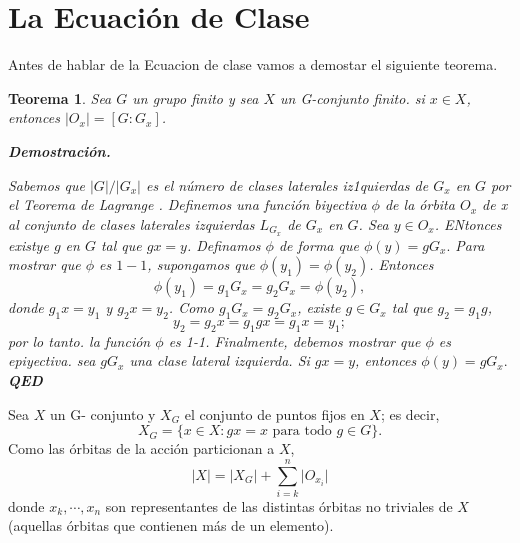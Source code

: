 \documentclass{article}
\newcounter{Teorema}
\numberwithin{equation}{section}
\theoremstyle{plain}  %
\newtheorem{thm}{Teorema}[section]
\providecommand{\abs}[1]{\lvert#1\rvert} %
\begin{document}
\tableofcontents
\newpage

	
\pagestyle{fancy}
\mbox{}	
\lhead[]{}
\newpage
\section{La Ecuación de Clase}
Antes de hablar de la Ecuacion de clase vamos a demostar el siguiente teorema. 
\begin{thm}
Sea $G$ un grupo finito y sea $X$ un G-conjunto finito. si $x  \in X$, entonces $\abs{O_{x}} = [G : G_{x}]$.

\vspace{5mm}
\textbf{Demostración.}
\vspace{5mm}

Sabemos que $\abs{G}/\abs{G_{x}} $
es el número de clases laterales iz1quierdas de $G_{x}$ en $G$ por el Teorema de Lagrange .
Definemos una función biyectiva $\phi$ de la órbita $O_{x}$ de x al conjunto de clases laterales izquierdas $L_{G_{x}}$ de $G_{x}$ en $G$. Sea $y \in O_{x}$. ENtonces existye $g$ en $G$ tal que $gx=y$. Definamos $\phi$ de forma que $\phi(y) = gG_{x}.$ Para mostrar que $\phi$ es $1-1$, supongamos que $\phi(y_{1}) = \phi(y_{2})$. Entonces
\begin{equation*}
    \phi(y_{1}) = g_{1}G_{x} = g_{2}G_{x} = \phi(y_{2}),
\end{equation*}
donde $g_{1}x = y_{1}$ y $g_{2}x = y_{2}$. Como $g_{1}G_{x} = g_{2}G_{x}$, existe $g \in G_{x}$ tal que $g_{2} = g_{1}g$,
\begin{equation*}
    y_{2} = g_{2}x = g_{1}gx = g_{1}x = y_{1};
\end{equation*}
por lo tanto. la función $\phi$ es 1-1. Finalmente, debemos mostrar que $\phi$ es epiyectiva. sea $gG_{x}$ una clase lateral izquierda. Si $gx=y$, entonces $\phi(y) = gG_{x}.$ \textbf{QED}
\end{thm}
Sea $X$ un G- conjunto y $X_{G}$ el conjunto de puntos fijos en $X$; es decir, 
\begin{equation*}
    X_{G} = \{x \in X : gx = x \text{ para todo }  g \in G\}. 
\end{equation*}
Como las órbitas de la acción particionan a $X$, 
\begin{equation*}
    \abs{X} = \abs{X_{G}}+ \sum_{i =k}^{n}\abs{O_{x_{i}}}
\end{equation*}
donde $x_{k},\cdots,x_{n}$ son representantes de las distintas órbitas no triviales de 
$X$ (aquellas órbitas que contienen más de un elemento). \vspace{5mm}
\end{document}
